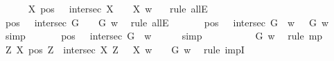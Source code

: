 \begin{isabellebody}
\ \ \ \ \isamarkupfalse%
\ {\isachardoublequoteopen}{\isacharparenleft}\isactrlbold {\isasymforall}X{\isachardot}\ {\isacharparenleft}{\isacharparenleft}pos\ {\isasymP}{\isacharparenright}\ \isactrlbold {\isasymand}\ {\isacharparenleft}intersec\ X\ {\isasymP}{\isacharparenright}{\isacharparenright}\ \isactrlbold {\isasymrightarrow}\ {\isasymP}\ X{\isacharparenright}\ w{\isachardoublequoteclose}\ \ \isamarkupfalse%
\ {\isacharparenleft}rule\ allE{\isacharparenright}\ \ \ \isanewline
\ \ \ \ \isamarkupfalse%
\ {\isachardoublequoteopen}{\isacharparenleft}{\isacharparenleft}{\isacharparenleft}pos\ {\isasymP}{\isacharparenright}\ \isactrlbold {\isasymand}\ {\isacharparenleft}intersec\ G\ {\isasymP}{\isacharparenright}{\isacharparenright}\ \isactrlbold {\isasymrightarrow}\ {\isasymP}\ G{\isacharparenright}\ w{\isachardoublequoteclose}\ \isamarkupfalse%
\ {\isacharparenleft}rule\ allE{\isacharparenright}\isanewline
\ \ \ \ \isamarkupfalse%
\ {}{\isacharcolon}\ {\isachardoublequoteopen}{\isacharparenleft}{\isacharparenleft}pos\ {\isasymP}\ \isactrlbold {\isasymand}\ intersec\ G\ {\isasymP}{\isacharparenright}\ w{\isacharparenright}\ {\isasymlongrightarrow}\ {\isasymP}\ G\ w{\isachardoublequoteclose}\ \isamarkupfalse%
\ simp\isanewline
\ \ \ \ \isamarkupfalse%
\ {}{\isacharcolon}\ {\isachardoublequoteopen}{\isacharparenleft}{\isacharparenleft}pos\ {\isasymP}{\isacharparenright}\ \isactrlbold {\isasymand}\ {\isacharparenleft}intersec\ G\ {\isasymP}{\isacharparenright}{\isacharparenright}\ w{\isachardoublequoteclose}\ \isamarkupfalse%
\ {}\ {}\ \isamarkupfalse%
\ simp\isanewline
\ \ \ \ \isamarkupfalse%
\ {}\ {}\ \isamarkupfalse%
\ {\isachardoublequoteopen}{\isasymP}\ G\ w{\isachardoublequoteclose}\ \isamarkupfalse%
\ {\isacharparenleft}rule\ mp{\isacharparenright}\isanewline
\ \ \isacommand{{\isacharbraceright}}\isamarkupfalse%
\isanewline
\ \ \isamarkupfalse%
\ {\isachardoublequoteopen}{\isacharparenleft}\isactrlbold {\isasymforall}Z\ X{\isachardot}\ {\isacharparenleft}pos\ Z\ \isactrlbold {\isasymand}\ intersec\ X\ Z{\isacharparenright}\ \isactrlbold {\isasymrightarrow}\ {\isasymP}\ X{\isacharparenright}\ w\ \ {\isasymlongrightarrow}\ {\isasymP}\ G\ w{\isachardoublequoteclose}\ \isamarkupfalse%
\ {\isacharparenleft}rule\ impI{\isacharparenright}\isanewline
\ \ \isacommand{{\isacharbraceright}}\isamarkupfalse%

\end{isabellebody}
